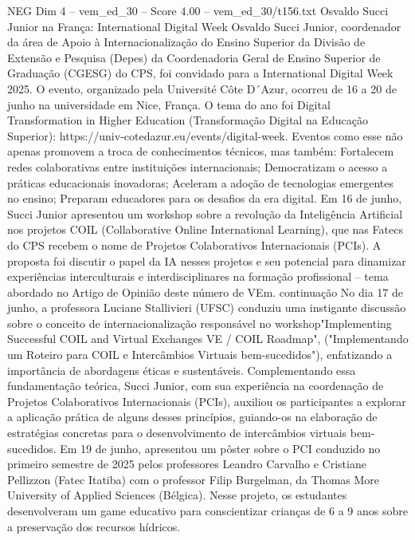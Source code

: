 \begin{textsample}{NEG Dim 4 – vem\_ed\_30 – Score 4.00 – vem\_ed\_30/t156.txt}  \label{ex:f4_neg_102}
Osvaldo Succi Junior na França: International Digital Week Osvaldo Succi Junior, coordenador da área de Apoio à Internacionalização do Ensino Superior da Divisão de Extensão e Pesquisa (Depes) da Coordenadoria Geral de Ensino Superior de Graduação (CGESG) do CPS, foi convidado para a International Digital Week 2025.
O evento, organizado pela Université Côte D´Azur, ocorreu de 16 a 20 de junho na universidade em Nice, França.
O tema do ano foi Digital Transformation in Higher Education (Transformação Digital na Educação Superior): https://univ-cotedazur.eu/events/digital-week.
Eventos como esse não apenas promovem a troca de conhecimentos técnicos, mas também: Fortalecem redes colaborativas entre instituições internacionais; Democratizam o acesso a práticas educacionais inovadoras; Aceleram a adoção de tecnologias emergentes no ensino; Preparam educadores para os desafios da era digital.
Em 16 de junho, Succi Junior apresentou um workshop sobre a revolução da Inteligência Artificial nos projetos COIL (Collaborative Online International Learning), que nas Fatecs do CPS recebem o nome de Projetos Colaborativos Internacionais (PCIs).
A proposta foi discutir o papel da IA nesses projetos e seu potencial para dinamizar experiências interculturais e interdisciplinares na formação profissional – tema abordado no Artigo de Opinião deste número de VEm. continuação No dia 17 de junho, a professora Luciane Stallivieri (UFSC) conduziu uma instigante discussão sobre o conceito de internacionalização responsável no workshop"Implementing Successful COIL and Virtual Exchanges VE / COIL Roadmap", ("Implementando um Roteiro para COIL e Intercâmbios Virtuais bem-sucedidos"), enfatizando a importância de abordagens éticas e sustentáveis.
Complementando essa fundamentação teórica, Succi Junior, com sua experiência na coordenação de Projetos Colaborativos Internacionais (PCIs), auxiliou os participantes a explorar a aplicação prática de alguns desses princípios, guiando-os na elaboração de estratégias concretas para o desenvolvimento de intercâmbios virtuais bem-sucedidos.
Em 19 de junho, apresentou um pôster sobre o PCI conduzido no primeiro semestre de 2025 pelos professores Leandro Carvalho e Cristiane Pellizzon (Fatec Itatiba) com o professor Filip Burgelman, da Thomas More University of Applied Sciences (Bélgica).
Nesse projeto, os estudantes desenvolveram um game educativo para conscientizar crianças de 6 a 9 anos sobre a preservação dos recursos hídricos.

\end{textsample}
